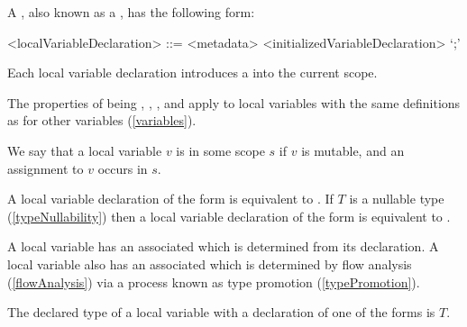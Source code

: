 \documentclass[makeidx]{article}
\begin{document}
{\LMHash{}%
A ,
also known as a ,
has the following form:

\begin{grammar}
<localVariableDeclaration> ::= <metadata> <initializedVariableDeclaration> `;'
\end{grammar}

\LMHash{}%
Each local variable declaration introduces
a 
into the current scope.


\LMHash{}%
The properties of being
,
,
, and
apply to local variables with the same definitions as for other variables
(\ref{variables}).

\LMHash{}%
We say that a local variable $v$ is 
in some scope $s$
if $v$ is mutable, and an assignment to $v$ occurs in $s$.

\LMHash{}%
A local variable declaration of the form  is equivalent to
.
If $T$ is a nullable type
(\ref{typeNullability})
then a local variable declaration of the form 
is equivalent to .


\LMHash{}%
A local variable has an associated
which is determined from its declaration.
A local variable also has an associated
which is determined by flow analysis
(\ref{flowAnalysis})
via a process known as type promotion
(\ref{typePromotion}).

\LMHash{}%
The declared type of a local variable with a declaration of one of the forms
is $T$.

}
\end{document}
